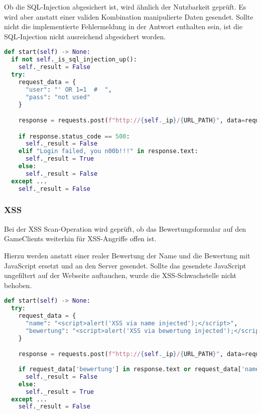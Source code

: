 Ob die SQL-Injection abgesichert ist, wird ähnlich der Nutzbarkeit geprüft. Es wird aber anstatt einer validen Kombination manipulierte Daten gesendet. Sollte nicht die implementierte Fehlermeldung  in der Antwort enthalten sein, ist die SQL-Injection nicht ausreichend abgesichert worden.

\begin{lstlisting}[language=Python, frame=single, caption={Big Brother SQL-Injection Save}, captionpos=b, label={lst:bigbrother-sql-injection-save}]
def start(self) -> None:
  if not self._is_sql_injection_up():
    self._result = False
  try:
    request_data = {
      "user": "' OR 1=1  #  ",
      "pass": "not used"
    }

    response = requests.post(f"http://{self._ip}/{URL_PATH}", data=request_data)

    if response.status_code == 500:
      self._result = False
    elif "Login failed, you n00b!!!" in response.text:
      self._result = True
    else:
      self._result = False
  except ...
    self._result = False
\end{lstlisting}

\subsubsection{XSS}
Bei der XSS Scan-Operation wird geprüft, ob das Bewertungsformular auf den GameClients weiterhin für XSS-Angriffe offen ist.

Hierzu werden anstatt einer realer Bewertung der Name und die Bewertung mit JavaScript ersetzt und an den Server gesendet. Sollte das gesendete JavaScript ungefiltert auf der Webseite auftauchen, wurde die XSS-Schwachstelle nicht behoben.
\begin{lstlisting}[language=Python, frame=single, caption={Big Brother XSS Save}, captionpos=b, label={lst:bigbrother-xss-save}]
def start(self) -> None:
  try:
    request_data = {
      "name": "<script>alert('XSS via name injected');</script>",
      "bewertung": "<script>alert('XSS via bewertung injected');</script>"
    }

    response = requests.post(f"http://{self._ip}/{URL_PATH}", data=request_data)
    
    if request_data['bewertung'] in response.text or request_data['name'] in response.text:
      self._result = False
    else:
      self._result = True
  except ...
    self._result = False
\end{lstlisting}

